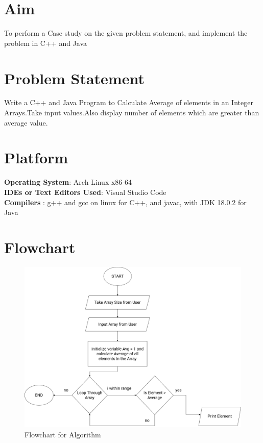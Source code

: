 \documentclass[11pt]{article}
\begin{document}
\tableofcontents
\thispagestyle{empty}
\clearpage


\setcounter{page}{1}
\section{Aim}
To perform a Case study on the given problem statement, and implement the problem in C++ and Java

\section{Problem Statement}
Write a C++ and Java Program to Calculate Average of elements in an Integer Arrays.Take input values.Also display number of elements which are greater than average value.


\section{Platform}
\textbf{Operating System}: Arch Linux x86-64 \\
\textbf{IDEs or Text Editors Used}: Visual Studio Code\\
\textbf{Compilers} : g++ and gcc on linux for C++, and javac, with JDK 18.0.2 for Java\\

\section{Flowchart}
\begin{figure}[H]
	\centering
	\includegraphics[scale=0.35]{flowchart.png}
	\caption{Flowchart for Algorithm}
\end{figure}
\end{document}
